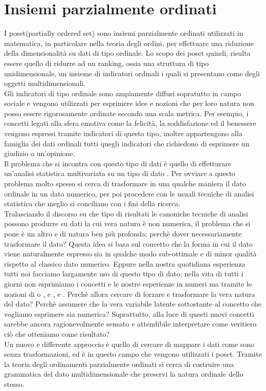 \documentclass[a4paper,12pt, openright]{report}
\begin{document}
\newpage


\chapter{Insiemi parzialmente ordinati}

I poset(partially ordered set) sono insiemi parzialmente ordinati utilizzati in matematica, in 
particolare nella teoria degli ordini, 
per effettuare una riduzione della dimensionalità su dati di tipo ordinale. Lo scopo dei poset quindi,
risulta essere quello di ridurre ad un ranking, ossia una struttura di tipo unidimensionale, un insieme di indicatori ordinali 
i quali si presentano come degli oggetti multidimensionali. \\
Gli indicatori di tipo ordinale sono ampiamente diffusi sopratutto in campo sociale e vengono 
utilizzati per esprimere idee e nozioni che per loro natura non posso essere rigorosamente ordinate secondo 
una scala metrica. Per esempio, i concetti legati alla sfera emotiva come la felicità, la soddisfazione ed il benessere vengono espressi tramite indicatori di questo tipo, inoltre appartengono alla famiglia dei dati ordinali 
tutti quegli indicatori che richiedono di esprimere un giudizio o un'opinione.\\
Il problema che si incontra con questo tipo di dati è quello di effetturare un'analisi statistica
multivariata su un tipo di dato . Per ovviare a questo problema molto spesso si 
cerca di trasformare in una qualche maniera il dato ordinale in un dato numerico, per poi procedere 
con le usuali tecniche di analisi statistica che meglio si conciliano con i fini della ricerca. \\
Tralasciando il discorso su che tipo di risultati le canoniche tecniche di analisi possono 
produrre su dati la cui vera natura è non numerica, il problema che si pone è un altro e di natura 
ben più profonda; perchè dover necessariamente trasformare il dato? Questa idea si basa sul concetto 
che la forma in cui il dato viene naturalmente espresso sia in qualche modo sub-ottimale e di minor 
qualità rispetto al classico dato numerico. Eppure nella nostra quotidiana esperienza tutti noi facciamo
largamente uso di questo tipo di dato; nella vita di tutti i giorni non esprimiamo i concetti e le nostre esperienze
in numeri ma tramite le nozioni di  o ,  e ,  e . 
Perchè allora cercare di forzare e trasformare la vera natura del dato? Perchè assumere che la vera 
variabile latente sottostante al concetto che vogliamo esprimere sia numerica? Soprattutto, alla luce di 
questi nuovi concetti sarebbe ancora ragionevolmente sensato e attendibile 
interpretare come veritiero ciò che otteniamo come risultato? \\
Un nuovo e differente approccio è quello di cercare di mappare i dati come sono senza trasformazioni, 
ed è in questo campo che vengono utilizzati i poset. Tramite la teoria degli ordinamenti parzialmente
ordinati si cerca di costruire una grammatica del dato multidimensionale che preservi la natura 
ordinale dello stesso. 
\end{document}
